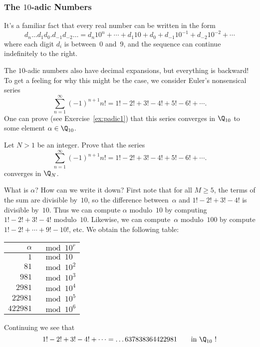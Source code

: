 \documentclass[11pt]{book}
\begin{document}
\begin{ch}
\begin{exercise}
\end{exercise}



\subsubsection{The $10$-adic Numbers}
\label{sec:tenadic}
It's a familiar fact that every real number can be written in the
form
$$
d_n\ldots d_1 d_0.d_{-1}d_{-2}\ldots
 = d_n 10^{n} + \cdots + d_1 10 + d_0
   + d_{-1} 10^{-1} + d_{-2} 10^{-2} + \cdots
$$
where each digit $d_i$ is between~$0$ and~$9$, and the sequence can
continue indefinitely to the right.

The $10$-adic numbers also have decimal expansions, but everything is backward!
To get a feeling for why this might be the case, we consider Euler's
nonsensical series
$$
  \sum_{n=1}^{\infty} (-1)^{n+1}n! = 1! - 2! + 3! - 4! + 5! - 6! + \cdots.
$$
One can prove (see Exercise~\ref{ex:padic1}) that this series
converges in $\Q_{10}$ to some element $\alpha\in\Q_{10}$.

\begin{exercise}\label{ex:topology5}
Let $N>1$ be an integer.  Prove that the series
$$
  \sum_{n=1}^{\infty} (-1)^{n+1}n! = 1! - 2! + 3! - 4! + 5! - 6! + \cdots.
$$
converges in $\Q_N$.
\end{exercise}


What is $\alpha$?  How can we write it down?  First note that for all
$M\geq 5$, the terms of the sum are divisible by~$10$, so the difference
between~$\alpha$ and $1! - 2! + 3! - 4!$ is divisible by~$10$.  Thus
we can compute $\alpha$ modulo~$10$ by computing $1! - 2! + 3! - 4!$
modulo~$10$.  Likewise, we can compute~$\alpha$ modulo~$100$
by compute $1! - 2! + \cdots + 9! - 10!$, etc.
We obtain the following table:
\begin{center}
\begin{tabular}{|rl|}\hline
$\alpha$ & $\mod 10^r$\\\hline
$1$ & $\mod 10$\\
$81$ & $\mod 10^2$\\
$981$ & $\mod 10^3$\\
$2981$ & $\mod 10^4$\\
$22981$ & $\mod 10^5$\\
$422981$ & $\mod 10^6$\\\hline
\end{tabular}
\end{center}
Continuing we see that
$$
 1! - 2! + 3! - 4! + \cdots =
  \ldots 637838364422981\qquad\text{in $\Q_{10}$ !}
$$


\end{ch}
\end{document}
